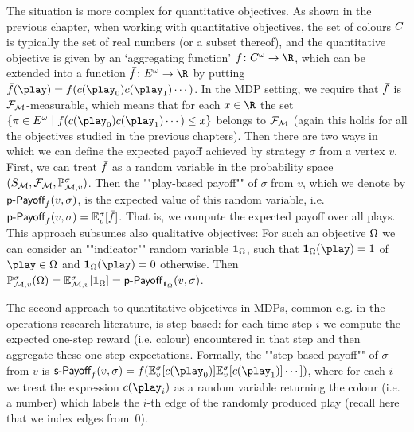The situation is more complex for quantitative objectives. As shown in the previous chapter, 
when working with quantitative objectives, the set of colours $C$ is typically the set of real numbers (or a subset thereof), and the quantitative objective is given by an `aggregating function' $\quantObj\colon \colours^\omega \rightarrow \R$, which can be extended into a function $\quantObjExt\colon \edges^\omega \rightarrow \R $ by putting $ \quantObjExt(\play) = \quantObj( \colouring(\play_0)\colouring(\play_1)\cdots) $.
In the MDP setting, we 
require that $\bar{f}$ is $\mathcal{F}_{\mathcal{M}}$-measurable, which 
means that for each $x\in \R$ the set $\{\pi\in \edges^\omega\mid 
\quantObj(\colouring(\play_0)\colouring(\play_1)\cdots) \leq x\}$ belongs to 
$\mathcal{F}_{\mathcal{M}}$ (again this holds for all the objectives studied 
in the previous chapters). Then there are two ways in which we can define the expected payoff achieved by strategy $ \sigma $ from a vertex $ v $.
First, we can treat 
$\bar{f}$ as a random variable 
in the probability space 
$(S_{\mathcal{M}},\mathcal{F}_{\mathcal{M}},\mathbb{P}^{\sigma}_{\mathcal{M},v})$. Then the ""play-based payoff"" of $\sigma$ from $ v $, which we denote by $ \textsf{p-Payoff}_f(v,\sigma) $, is the expected value of this random variable, i.e. $ \textsf{p-Payoff}_f(v,\sigma) = \mathbb{E}_{v}^\sigma [\bar{f}] $. That is, we compute the expected payoff over all plays. This approach subsumes also qualitative objectives: For such an objective $\Omega$ we can consider an ""indicator"" random 
variable $\mathbf{1}_{\Omega}$, such that $\indicator{\objective}(\play)=1$ 
of 
$\play\in\Omega$ and $\indicator{\objective}(\play)=0$ otherwise. Then 
$\mathbb{P}^{\sigma}_{\mathcal{M},v}(\Omega) = 
\mathbb{E}^{\sigma}_{\mathcal{M},v}[\mathbf{1}_{\Omega}] = \textsf{p-Payoff}_{\mathbf{1}_{\Omega}}(v,\sigma)$.




The second approach to quantitative objectives in MDPs, common e.g. in the operations research literature, is step-based: for each time step $i$ we compute the expected one-step reward (i.e. colour) encountered in that step and then  aggregate  these one-step expectations. Formally, the ""step-based payoff"" of $ \sigma $ from $ v $ is $ \stepPay_f(v,\sigma) = \quantObj(\expv_{v}^\sigma[\colouring(\play_0)] \expv_{v}^\sigma[\colouring(\play_1)]\cdots] ) $, where for each $ i $ we treat the expression $ \colouring(\play_i) $ as a random variable returning the colour (i.e. a number) which labels the $ i $-th edge of the randomly produced play (recall here that we index edges from~$ 0 $). 

